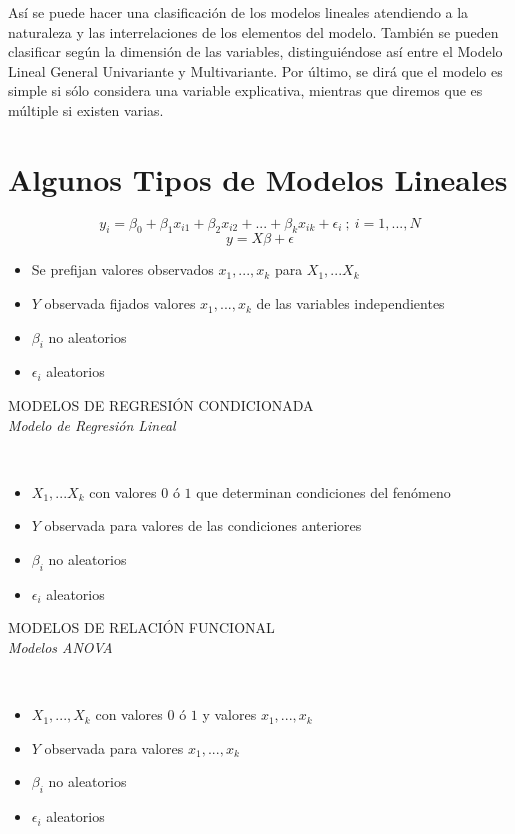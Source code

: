 \documentclass[10pt,a4paper]{book}
\begin{document}
Así se puede hacer una clasificación de los modelos lineales atendiendo a la naturaleza y las interrelaciones de los elementos del modelo. También se pueden clasificar según la dimensión de las variables, distinguiéndose así entre el Modelo Lineal General Univariante y Multivariante. Por último, se dirá que el modelo es
simple si sólo considera una variable explicativa, mientras que diremos que es múltiple si existen varias.

	\section{Algunos Tipos de Modelos Lineales}
$$y_i = \beta_0 + \beta_1x_{i1} + \beta_2x_{i2} +...+ \beta_kx_{ik} + \epsilon_i\ ;\ i=1,...,N$$
$$y = X\beta + \epsilon$$

\begin{itemize}
\item Se prefijan valores observados $x_1,...,x_k$ para $X_1,...X_k$
\item $Y$ observada fijados valores $x_1,...,x_k$ de las variables independientes
\item $\beta_i$ no aleatorios
\item $\epsilon_i$ aleatorios
\end{itemize}
\begin{center}
MODELOS DE REGRESIÓN CONDICIONADA\\
\textit{Modelo de Regresión Lineal}
\end{center}
\ \\
\begin{itemize}
\item $X_1,...X_k$ con valores $0$ ó $1$ que determinan condiciones del fenómeno
\item $Y$ observada para valores de las condiciones anteriores
\item $\beta_i$ no aleatorios
\item $\epsilon_i$ aleatorios
\end{itemize}
\begin{center}
MODELOS DE RELACIÓN FUNCIONAL\\
\textit{Modelos ANOVA}
\end{center}
\ \\
\begin{itemize}
\item $X_1,...,X_k$ con valores $0$ ó $1$ y valores $x_1,...,x_k$
\item $Y$ observada para valores $x_1,...,x_k$
\item $\beta_i$ no aleatorios
\item $\epsilon_i$ aleatorios
\end{itemize}
\end{document}
